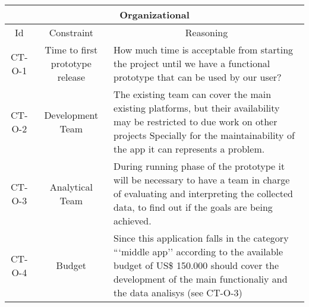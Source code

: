 \begin{table}[H]
    \begin{tabularx}{\textwidth}{|c|c|X|}
        \hline
        \multicolumn{3}{c}{\textbf{Organizational}} \\
        \hline
        \toprule
        \multicolumn{1}{c}{Id} & \multicolumn{1}{c}{Constraint} & \multicolumn{1}{c}{Reasoning} \\
        \midrule
        CT-O-1 & Time to first prototype release & How much time is acceptable from starting the project
        until we have a functional prototype that can be used by our user? \\
        CT-O-2 & Development Team & The existing team can cover the main existing platforms, but their availability
        may be restricted to due work on other projects Specially for the maintainability of the app it can represents
        a problem. \\
        CT-O-3 & Analytical Team & During running phase of the prototype it will be necessary to have a team in charge
        of evaluating and interpreting the collected data, to find out if the goals are being achieved. \\
        CT-O-4 & Budget & Since this application falls in the category ```middle app'' according to \cite{refonline:SPDLOAD}
        the available budget of US\$ 150.000 should cover the development of the main functionaliy and the data analisys 
        (see CT-O-3) \\
        \bottomrule
    \end{tabularx}
\end{table}













